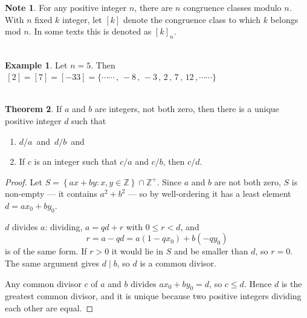 \documentclass[11pt,a4paper]{article}
\theoremstyle{definition}
\newtheorem{thm}{Theorem}[subsection]
\newtheorem{exa}[thm]{Example}
\newtheorem*{note}{Note}
\begin{document}
\begin{note}
For any positive integer $n$, there are $n$ congruence classes modulo $n$.  With $n$ fixed $k$ integer, let $[k]$ denote the congruence class to which $k$ belongs mod $n$. In some texts this is denoted as $[k]_n$.\\\\
\end{note}






\begin{exa}
Let $n = 5$. Then $\, [2] = [7] = [-33] =  \big\{\cdots\cdots\, ,\, -8\, , \, -3\, , \, 2\, , \, 7\, , \, 12\, , \cdots\cdots\big\}$\\\\
\end{exa}






\begin{thm}
If $a$ and $b$ are integers, not both zero, then there is a unique positive integer $d$ such that
\begin{enumerate}
\item[(a).] $d/a\,$ and $\, d/b\,$ and 
\item[(b).] If $c$ is an integer such that $c/a$ and $c/b$, then $c/d$.\\
\end{enumerate}
\end{thm}

\begin{proof}
Let $S = \left\{ax+by : x,y\in\mathbb{Z}\right\}\cap\mathbb{Z}^{+}$. Since $a$
and $b$ are not both zero, $S$ is non-empty --- it contains $a^{2}+b^{2}$ --- so
by well-ordering it has a least element $d = ax_0+by_0$.

$d$ divides $a$: dividing, $a = qd + r$ with $0\leq r<d$, and
$$r = a - qd = a\left(1-qx_0\right) + b\left(-qy_0\right)$$
is of the same form. If $r>0$ it would lie in $S$ and be smaller than $d$, so
$r=0$. The same argument gives $d\mid b$, so $d$ is a common divisor.

Any common divisor $c$ of $a$ and $b$ divides $ax_0+by_0 = d$, so $c\leq d$.
Hence $d$ is the greatest common divisor, and it is unique because two positive
integers dividing each other are equal.
\end{proof}
\end{document}
